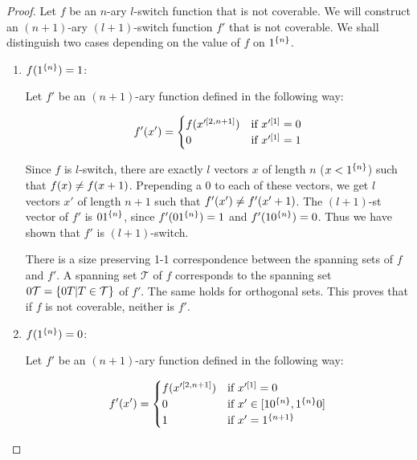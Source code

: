 \begin{proof}
Let $f$ be an $n$-ary $l$-switch function
that is not coverable.
We will construct an $(n+1)$-ary $(l+1)$-switch function $f'$
that is not coverable.
We shall distinguish two cases depending on the value of $f$ on $1^{\{n\}}$.

\begin{enumerate}
\item $f (1^{\{n\}}) = 1$:

Let $f'$ be an $(n+1)$-ary function
defined in the following way:

\[
f' (x') =
\begin{cases}
f (x'^{[2, n+1]}) & \text{if } x'^{[1]} = 0 \\
0 & \text{if } x'^{[1]} = 1
\end{cases}
\]

Since $f$ is $l$-switch,
there are exactly $l$ vectors $x$ of length $n$
($x < 1^{\{n\}}$)
such that $f (x) \neq f (x+1)$.
Prepending a $0$ to each of these vectors,
we get $l$ vectors $x'$ of length $n+1$
such that $f' (x') \neq f' (x'+1)$.
The $(l+1)$-st  vector of $f'$
is $0 1^{\{n\}}$,
since $f' (0 1^{\{n\}}) = 1$
and $f' (1 0^{\{n\}}) = 0$.
Thus we have shown that $f'$ is $(l+1)$-switch.

There is
a size preserving
1-1 correspondence
between the spanning sets of $f$ and $f'$.
A spanning set $\mathcal{T}$ of $f$
corresponds to the spanning set
$0 \mathcal{T} = \{0 T | T \in \mathcal{T}\}$ of $f'$.
The same holds for orthogonal sets.
This proves that if $f$ is not coverable,
neither is $f'$.

\item $f (1^{\{n\}}) = 0$:

Let $f'$ be an $(n+1)$-ary function
defined in the following way:

\[
f' (x') =
\begin{cases}
f (x'^{[2, n+1]}) & \text{if } x'^{[1]} = 0 \\
0 & \text{if } x' \in [1 0^{\{n\}}, 1^{\{n\}} 0] \\
1 & \text{if } x' = 1^{\{n+1\}}
\end{cases}
\]



\end{enumerate}
\end{proof}
